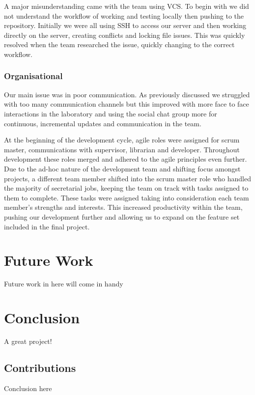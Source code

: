 \documentclass{l3proj}
\begin{document}
A major misunderstanding came with the team using VCS. To begin with we did not
understand the workflow of working and testing locally then pushing to the
repository. Initially we were all using SSH to access our server and then
working directly on the server, creating conflicts and locking file issues. This
was quickly resolved when the team researched the issue, quickly changing to the
correct workflow.

\subsection{Organisational}
Our main issue was in poor communication. As
previously discussed we struggled with too many communication channels but this
improved with more face to face interactions in the laboratory and using the
social chat group more for continuous, incremental updates and communication in
the team.

At the beginning of the development cycle, agile roles were assigned for scrum
master, communications with supervisor, librarian and developer. Throughout
development these roles merged and adhered to the agile principles even further.
Due to the ad-hoc nature of the development team and shifting focus amongst
projects, a different team member shifted into the scrum master role who handled
the majority of secretarial jobs, keeping the team on track with tasks assigned
to them to complete. These tasks were assigned taking into consideration each
team member’s strengths and interests. This increased productivity within the
team, pushing our development further and allowing us to expand on the feature
set included in the final project.

\chapter{Future Work}
\label{Future Work}

Future work in here will come in handy

\chapter{Conclusion}

A great project!

\section{Contributions}

Conclusion here



\end{document}
